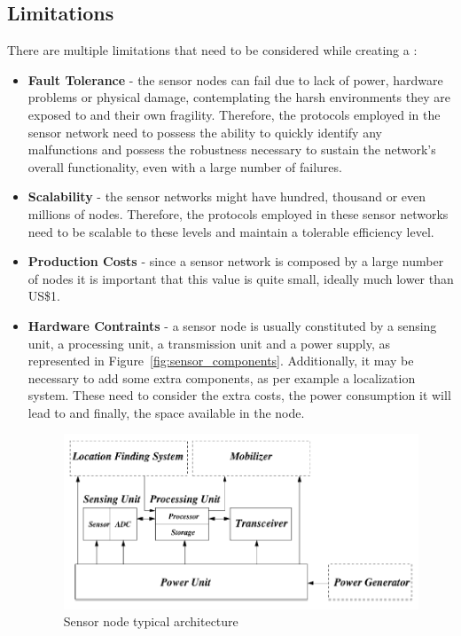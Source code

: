 \subsection{Limitations}
\label{subsec:wsn_limitations}
There are multiple limitations that need to be considered while creating a 
\cite{Akyildiz2002, Matin2012}:
\begin{itemize}
      \item \textbf{Fault Tolerance} - the sensor nodes can fail due to lack of power, hardware
            problems or physical damage, contemplating the harsh environments they are exposed to
            and their own fragility. Therefore, the protocols employed in the sensor network
            need to possess the ability to quickly identify any malfunctions and possess the
            robustness necessary to sustain the network's overall functionality, even with a large
            number of failures.
      \item \textbf{Scalability} - the sensor networks might have hundred, thousand or even
            millions of nodes. Therefore, the protocols employed in these sensor networks need to
            be scalable to these levels and maintain a tolerable efficiency level.
      \item \textbf{Production Costs} - since a sensor network is composed by a large number of
            nodes it is important that this value is quite small, ideally much lower than US\$1.
      \item \textbf{Hardware Contraints} - a sensor node is usually constituted by a sensing
            unit, a processing unit, a transmission unit and a power supply, as represented in
            Figure~\ref{fig:sensor_components}. Additionally, it may be necessary to add some
            extra components, as per example a localization system. These need to consider the
            extra costs, the power consumption it will lead to and finally, the space available
            in the node.
            \begin{figure}[H]
                  \caption{Sensor node typical architecture \cite{Akyildiz2002}}
                  \centering
                  \includegraphics[scale=1]{Chapters/Figures/sensor_components.png}

\end{figure}
\end{itemize}
